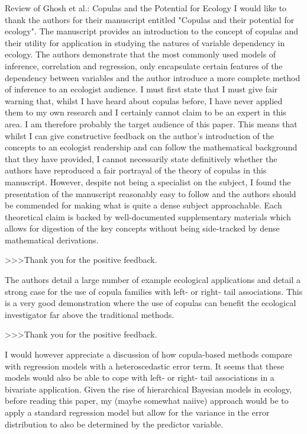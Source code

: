 Review of Ghosh et al.: Copulas and the Potential for Ecology
I would like to thank the authors for their manuscript entitled "Copulas and their potential for ecology".  The manuscript provides an introduction to the concept of copulas and their utility for application in studying the natures of variable dependency in ecology.  The authors demonstrate that the most commonly used models of inference, correlation and regression, only encapsulate certain features of the dependency between variables and the author introduce a more complete method of inference to an ecologist audience.
I must first state that I must give fair warning that, whilst I have heard about copulas before, I have never applied them to my own research and I certainly cannot claim to be an expert in this area.  I am therefore probably the target audience of this paper.  This means that whilst I can give constructive feedback on the author's introduction of the concepts to an ecologist readership and can follow the mathematical background that they have provided, I cannot necessarily state definitively whether the authors have reproduced a fair portrayal of the theory of copulas in this manuscript.
However, despite not being a specialist on the subject, I found the presentation of the manuscript reasonably easy to follow and the authors should be commended for making what is quite a dense subject approachable.  Each theoretical claim is backed by well-documented supplementary materials which allows for digestion of the key concepts without being side-tracked by dense mathematical derivations.

>>>Thank you for the positive feedback.

The authors detail a large number of example ecological applications and detail a strong case for the use of copula families with left- or right- tail associations.  This is a very good demonstration where the use of copulas can benefit the ecological investigator far above the traditional methods.  

>>>Thank you for the positive feedback.

I would however appreciate a discussion of how copula-based methods compare with regression models with a heteroscedastic error term.  It seems that these models would also be able to cope with left- or right- tail associations in a bivariate application.  Given the rise of hierarchical Bayesian models in ecology, before reading this paper, my (maybe somewhat naiive) approach would be to apply a standard regression model but allow for the variance in the error distribution to also be determined by the predictor variable.

